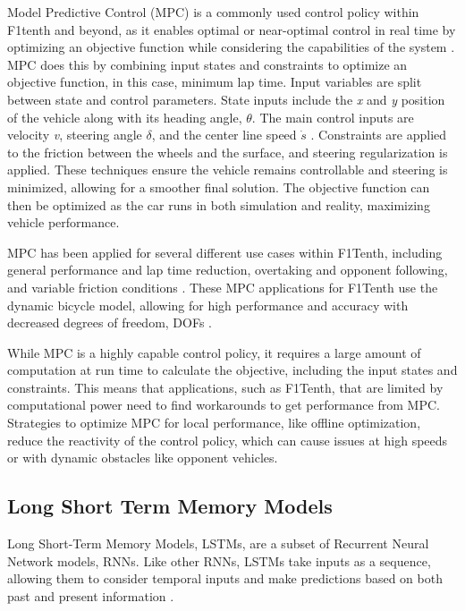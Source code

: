 \documentclass[conference]{IEEEtran}
\begin{document}
Model Predictive Control (MPC) is a commonly used control policy within F1tenth and beyond, as it enables optimal or near-optimal control in real time by optimizing an objective function while considering the capabilities of the system \cite{evans2024unifying}. MPC does this by combining input states and constraints to optimize an objective function, in this case, minimum lap time. Input variables are split between state and control parameters. State inputs include the \textit{x} and \textit{y} position of the vehicle along with its heading angle, $\theta$. The main control inputs are velocity \textit{v}, steering angle $\delta$, and the center line speed $\dot{s}$ \cite{evans2024unifying}. Constraints are applied to the friction between the wheels and the surface, and steering regularization is applied. These techniques ensure the vehicle remains controllable and steering is minimized, allowing for a smoother final solution. The objective function can then be optimized as the car runs in both simulation and reality, maximizing vehicle performance. 

 MPC has been applied for several different use cases within F1Tenth, including general performance and lap time reduction, overtaking and opponent following, and variable friction conditions \cite{cataffo2022nonlinear,bhargav2021track,li2023realtime,nagy2023adaptive}. These MPC applications for F1Tenth use the dynamic bicycle model, allowing for high performance and accuracy with decreased degrees of freedom, DOFs \cite{cataffo2022nonlinear,bhargav2021track,li2023realtime,nagy2023adaptive}.

While MPC is a highly capable control policy, it requires a large amount of computation at run time to calculate the objective, including the input states and constraints. This means that applications, such as F1Tenth, that are limited by computational power need to find workarounds to get performance from MPC. Strategies to optimize MPC for local performance, like offline optimization, reduce the reactivity of the control policy, which can cause issues at high speeds or with dynamic obstacles like opponent vehicles. 

\subsection{Long Short Term Memory Models}

Long Short-Term Memory Models, LSTMs, are a subset of Recurrent Neural Network models, RNNs. Like other RNNs, LSTMs take inputs as a sequence, allowing them to consider temporal inputs and make predictions based on both past and present information \cite{ai6090215}. 
\end{document}
